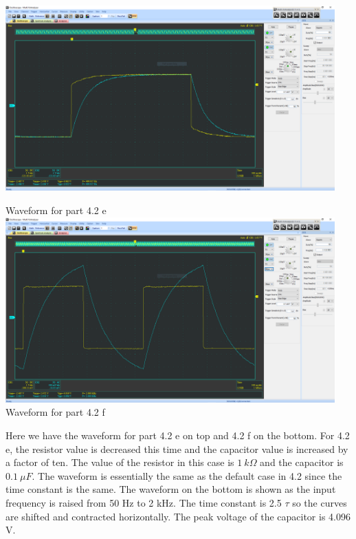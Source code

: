 \documentclass[12pt]{article}
\newcommand{\objects}[2]{%
  \leavevmode\vbox{\hbox{#1}\nointerlineskip\hbox{#2}}%
}
\begin{document}
    \begin{center}
        \objects
            {\includegraphics[width=0.95\textwidth]{4.2 e.png}}
            \,
            Waveform for part 4.2 e
            {\includegraphics[width=0.95\textwidth]{4.2 f.png}}
            \,
            Waveform for part 4.2 f
    \end{center}
    \begin{center}
        Here we have the waveform for part 4.2 e on top and 4.2 f on the bottom.  For 4.2 e, the resistor value is decreased this time and the capacitor value is increased by a factor of ten. The value of the resistor in this case is $ 1\ k\Omega $ and the capacitor is $ 0.1\ \mu F $. The waveform is essentially the same as the default case in 4.2 since the time constant is the same. The waveform on the bottom is shown as the input frequency is raised from 50 Hz to 2 kHz. The time constant is 2.5 $ \tau $ so the curves are shifted and contracted horizontally. The peak voltage of the capacitor is 4.096 V.
    \end{center}
    \newpage
\end{document}
